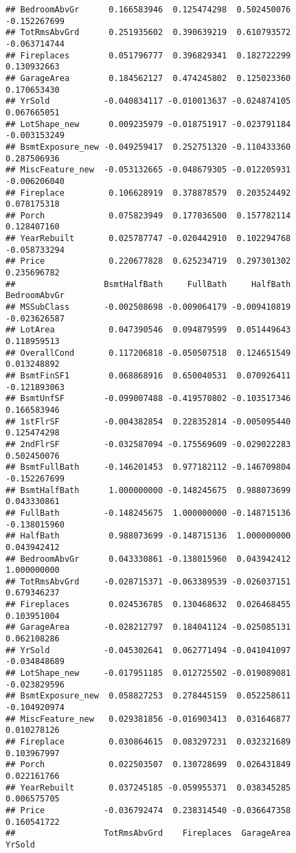 \documentclass[]{article}
\begin{document}
\begin{verbatim}
## BedroomAbvGr      0.166583946  0.125474298  0.502450076 -0.152267699
## TotRmsAbvGrd      0.251935602  0.390639219  0.610793572 -0.063714744
## Fireplaces        0.051796777  0.396829341  0.182722299  0.130932663
## GarageArea        0.184562127  0.474245802  0.125023360  0.170653430
## YrSold           -0.040834117 -0.010013637 -0.024874105  0.067665051
## LotShape_new      0.009235979 -0.018751917 -0.023791184 -0.003153249
## BsmtExposure_new -0.049259417  0.252751320 -0.110433360  0.287506936
## MiscFeature_new  -0.053132665 -0.048679305 -0.012205931 -0.006206040
## Fireplace         0.106628919  0.378878579  0.203524492  0.078175318
## Porch             0.075823949  0.177036500  0.157782114  0.128407160
## YearRebuilt       0.025787747 -0.020442910  0.102294768 -0.058733294
## Price             0.220677828  0.625234719  0.297301302  0.235696782
##                  BsmtHalfBath     FullBath     HalfBath BedroomAbvGr
## MSSubClass       -0.002508698 -0.009064179 -0.009410819 -0.023626587
## LotArea           0.047390546  0.094879599  0.051449643  0.118959513
## OverallCond       0.117206818 -0.050507518  0.124651549  0.013248892
## BsmtFinSF1        0.068868916  0.650040531  0.070926411 -0.121893063
## BsmtUnfSF        -0.099007488 -0.419570802 -0.103517346  0.166583946
## 1stFlrSF         -0.004382854  0.228352814 -0.005095440  0.125474298
## 2ndFlrSF         -0.032587094 -0.175569609 -0.029022283  0.502450076
## BsmtFullBath     -0.146201453  0.977182112 -0.146709804 -0.152267699
## BsmtHalfBath      1.000000000 -0.148245675  0.988073699  0.043330861
## FullBath         -0.148245675  1.000000000 -0.148715136 -0.138015960
## HalfBath          0.988073699 -0.148715136  1.000000000  0.043942412
## BedroomAbvGr      0.043330861 -0.138015960  0.043942412  1.000000000
## TotRmsAbvGrd     -0.028715371 -0.063389539 -0.026037151  0.679346237
## Fireplaces        0.024536785  0.130468632  0.026468455  0.103951004
## GarageArea       -0.028212797  0.184041124 -0.025085131  0.062108286
## YrSold           -0.045302641  0.062771494 -0.041041097 -0.034848689
## LotShape_new     -0.017951185  0.012725502 -0.019089081 -0.023829596
## BsmtExposure_new  0.058827253  0.278445159  0.052258611 -0.104920974
## MiscFeature_new   0.029381856 -0.016903413  0.031646877  0.010278126
## Fireplace         0.030864615  0.083297231  0.032321689  0.103967997
## Porch             0.022503507  0.130728699  0.026431849  0.022161766
## YearRebuilt       0.037245185 -0.059955371  0.038345285  0.006575705
## Price            -0.036792474  0.238314540 -0.036647358  0.160541722
##                  TotRmsAbvGrd    Fireplaces  GarageArea       YrSold

\end{verbatim}
\end{document}
